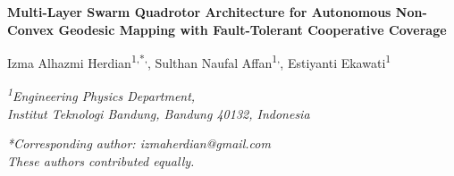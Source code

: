 \documentclass[11pt]{article}
\begin{document}
\begin{center}
      {\fontsize{18}{22}\bfseries
            Multi-Layer Swarm Quadrotor Architecture for Autonomous Non-Convex
            Geodesic Mapping with Fault-Tolerant Cooperative Coverage
      }

      \vspace{1.5ex}

      {\fontsize{14}{17}\selectfont
            Izma Alhazmi Herdian\textsuperscript{1,*,\textdagger},
            Sulthan Naufal Affan\textsuperscript{1,\textdagger},
            Estiyanti Ekawati\textsuperscript{1}
      }

      \vspace{1ex}

      {\fontsize{10}{12}\itshape
            \textsuperscript{1}Engineering Physics Department,\\
            Institut Teknologi Bandung, Bandung 40132, Indonesia
      }

      \vspace{0.5ex}

      {\fontsize{10}{12}\itshape
            *Corresponding author: izmaherdian@gmail.com\\
            \textdagger These authors contributed equally.
      }
\end{center}

\vspace{1.2ex}
\end{document}
